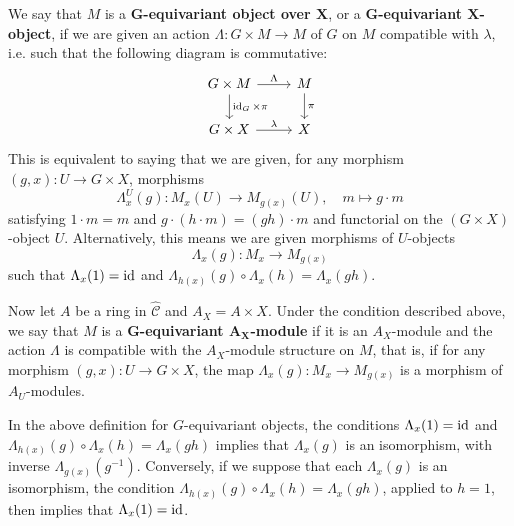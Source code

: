 \begin{definition}
We say that $M$ is a \textbf{$\bm{G}$-equivariant object over $\bm{X}$}, or a \textbf{$\bm{G}$-equivariant $\bm{X}$-object}, if we are given an action $\Lambda:G\times M\to M$ of $G$ on $M$ compatible with $\lambda$, i.e. such that the following diagram is commutative:
\[\begin{tikzcd}
G\times M\ar[r,"\Lambda"]\ar[d,"\id_G\times\pi"]&M\ar[d,"\pi"]\\
G\times X\ar[r,"\lambda"]&X
\end{tikzcd}\]
This is equivalent to saying that we are given, for any morphism $(g,x):U\to G\times X$, morphisms
\[\Lambda_x^U(g):M_x(U)\to M_{g(x)}(U),\quad m\mapsto g\cdot m\]
satisfying $1\cdot m=m$ and $g\cdot(h\cdot m)=(gh)\cdot m$ and functorial on the $(G\times X)$-object $U$. Alternatively, this means we are given morphisms of $U$-objects
\[\Lambda_x(g):M_x\to M_{g(x)}\]
such that $\Lambda_x(1)=\operatorname{id}$ and $\Lambda_{h(x)}(g)\circ\Lambda_x(h)=\Lambda_x(gh)$.\par
Now let $A$ be a ring in $\widehat{\mathcal{C}}$ and $A_X=A\times X$. Under the condition described above, we say that $M$ is a \textbf{$\bm{G}$-equivariant $\bm{A_X}$-module} if it is an $A_X$-module and the action $\Lambda$ is compatible with the $A_X$-module structure on $M$, that is, if for any morphism $(g,x):U\to G\times X$, the map $\Lambda_x(g):M_x\to M_{g(x)}$ is a morphism of $A_U$-modules.
\end{definition}

\begin{remark}
In the above definition for $G$-equivariant objects, the conditions $\Lambda_x(1)=\operatorname{id}$ and $\Lambda_{h(x)}(g)\circ\Lambda_x(h)=\Lambda_x(gh)$ implies that $\Lambda_x(g)$ is an isomorphism, with inverse $\Lambda_{g(x)}(g^{-1})$. Conversely, if we suppose that each $\Lambda_x(g)$ is an isomorphism, the condition $\Lambda_{h(x)}(g)\circ\Lambda_x(h)=\Lambda_{x}(gh)$, applied to $h=1$, then implies that $\Lambda_x(1)=\operatorname{id}$.
\end{remark}


